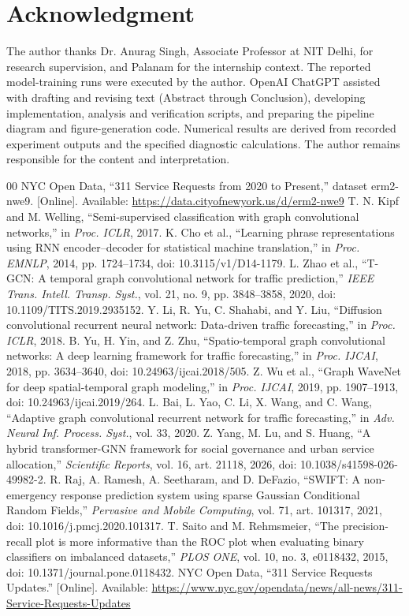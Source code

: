\documentclass[conference]{IEEEtran}
\begin{document}
\section*{Acknowledgment}
The author thanks Dr. Anurag Singh, Associate Professor at NIT Delhi, for research supervision, and Palanam for the internship context. The reported model-training runs were executed by the author. OpenAI ChatGPT assisted with drafting and revising text (Abstract through Conclusion), developing implementation, analysis and verification scripts, and preparing the pipeline diagram and figure-generation code. Numerical results are derived from recorded experiment outputs and the specified diagnostic calculations. The author remains responsible for the content and interpretation.
\begin{thebibliography}{00}
 NYC Open Data, ``311 Service Requests from 2020 to Present,'' dataset erm2-nwe9. [Online]. Available: \url{https://data.cityofnewyork.us/d/erm2-nwe9}
 T. N. Kipf and M. Welling, ``Semi-supervised classification with graph convolutional networks,'' in \emph{Proc. ICLR}, 2017.
 K. Cho et al., ``Learning phrase representations using RNN encoder--decoder for statistical machine translation,'' in \emph{Proc. EMNLP}, 2014, pp. 1724--1734, doi: 10.3115/v1/D14-1179.
 L. Zhao et al., ``T-GCN: A temporal graph convolutional network for traffic prediction,'' \emph{IEEE Trans. Intell. Transp. Syst.}, vol. 21, no. 9, pp. 3848--3858, 2020, doi: 10.1109/TITS.2019.2935152.
 Y. Li, R. Yu, C. Shahabi, and Y. Liu, ``Diffusion convolutional recurrent neural network: Data-driven traffic forecasting,'' in \emph{Proc. ICLR}, 2018.
 B. Yu, H. Yin, and Z. Zhu, ``Spatio-temporal graph convolutional networks: A deep learning framework for traffic forecasting,'' in \emph{Proc. IJCAI}, 2018, pp. 3634--3640, doi: 10.24963/ijcai.2018/505.
 Z. Wu et al., ``Graph WaveNet for deep spatial-temporal graph modeling,'' in \emph{Proc. IJCAI}, 2019, pp. 1907--1913, doi: 10.24963/ijcai.2019/264.
 L. Bai, L. Yao, C. Li, X. Wang, and C. Wang, ``Adaptive graph convolutional recurrent network for traffic forecasting,'' in \emph{Adv. Neural Inf. Process. Syst.}, vol. 33, 2020.
 Z. Yang, M. Lu, and S. Huang, ``A hybrid transformer-GNN framework for social governance and urban service allocation,'' \emph{Scientific Reports}, vol. 16, art. 21118, 2026, doi: 10.1038/s41598-026-49982-2.
 R. Raj, A. Ramesh, A. Seetharam, and D. DeFazio, ``SWIFT: A non-emergency response prediction system using sparse Gaussian Conditional Random Fields,'' \emph{Pervasive and Mobile Computing}, vol. 71, art. 101317, 2021, doi: 10.1016/j.pmcj.2020.101317.
 T. Saito and M. Rehmsmeier, ``The precision-recall plot is more informative than the ROC plot when evaluating binary classifiers on imbalanced datasets,'' \emph{PLOS ONE}, vol. 10, no. 3, e0118432, 2015, doi: 10.1371/journal.pone.0118432.
 NYC Open Data, ``311 Service Requests Updates.'' [Online]. Available: \url{https://www.nyc.gov/opendata/news/all-news/311-Service-Requests-Updates}
\end{thebibliography}
\end{document}
